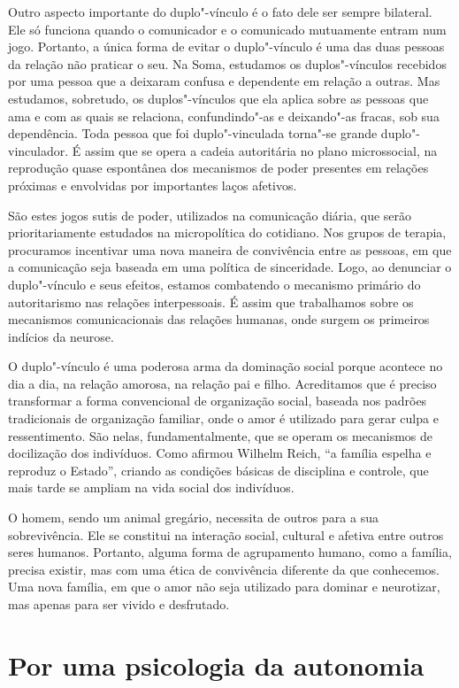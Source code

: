 Outro aspecto importante do duplo"-vínculo é o fato dele ser sempre
bilateral. Ele só funciona quando o comunicador e o comunicado
mutuamente entram num jogo. Portanto, a única forma de evitar o
duplo"-vínculo é uma das duas pessoas da relação não praticar o seu. Na
Soma, estudamos os duplos"-vínculos recebidos por uma pessoa que a
deixaram confusa e dependente em relação a outras. Mas estudamos,
sobretudo, os duplos"-vínculos que ela aplica sobre as pessoas que ama e
com as quais se relaciona, confundindo"-as e deixando"-as fracas, sob sua
dependência. Toda pessoa que foi duplo"-vinculada torna"-se grande
duplo"-vinculador. É assim que se opera a cadeia autoritária no plano
microssocial, na reprodução quase espontânea dos mecanismos de poder
presentes em relações próximas e envolvidas por importantes laços
afetivos.

São estes jogos sutis de poder, utilizados na comunicação diária, que
serão prioritariamente estudados na micropolítica do cotidiano. Nos
grupos de terapia, procuramos incentivar uma nova maneira de convivência
entre as pessoas, em que a comunicação seja baseada em uma política de
sinceridade. Logo, ao denunciar o duplo"-vínculo e seus efeitos, estamos
combatendo o mecanismo primário do autoritarismo nas relações
interpessoais. É assim que trabalhamos sobre os mecanismos
comunicacionais das relações humanas, onde surgem os primeiros indícios
da neurose.

O duplo"-vínculo é uma poderosa arma da dominação social porque acontece
no dia a dia, na relação amorosa, na relação pai e filho. Acreditamos
que é preciso transformar a forma convencional de organização social,
baseada nos padrões tradicionais de organização familiar, onde o amor é
utilizado para gerar culpa e ressentimento. São nelas, fundamentalmente,
que se operam os mecanismos de docilização dos indivíduos. Como afirmou
Wilhelm Reich, ``a família espelha e reproduz o Estado'', criando as
condições básicas de disciplina e controle, que mais tarde se ampliam na
vida social dos indivíduos.

O homem, sendo um animal gregário, necessita de outros para a sua
sobrevivência. Ele se constitui na interação social, cultural e afetiva
entre outros seres humanos. Portanto, alguma forma de agrupamento
humano, como a família, precisa existir, mas com uma ética de
convivência diferente da que conhecemos. Uma nova família, em que o amor
não seja utilizado para dominar e neurotizar, mas apenas para ser vivido
e desfrutado.

\section{Por uma psicologia da autonomia}

